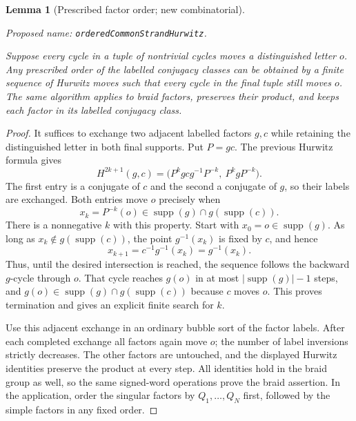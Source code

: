 \documentclass[11pt,a4paper]{article}
\newtheorem{lemma}[theorem]{Lemma}
\theoremstyle{remark}
\newcommand{\formalname}[1]{\leavevmode\par\noindent\textnormal{\small Proposed name: \texttt{#1}.}\par\smallskip}
\begin{document}
\begin{lemma}[Prescribed factor order; new combinatorial]
\label{lem:ordered-hurwitz}
\formalname{orderedCommonStrandHurwitz}
Suppose every cycle in a tuple of nontrivial cycles moves a distinguished
letter $o$.  Any prescribed order of the labelled conjugacy classes can
be obtained by a finite sequence of Hurwitz moves such that every cycle
in the final tuple still moves $o$.  The same algorithm applies to braid
factors, preserves their product, and keeps each factor in its labelled
conjugacy class.
\end{lemma}
\begin{proof}
It suffices to exchange two adjacent labelled factors $g,c$ while
retaining the distinguished letter in both final supports.  Put $P=gc$.
The previous Hurwitz formula gives
\[
 H^{2k+1}(g,c)=
 \bigl(P^k g c g^{-1}P^{-k},\ P^k gP^{-k}\bigr).
\]
The first entry is a conjugate of $c$ and the second a conjugate of
$g$, so their labels are exchanged.  Both entries move $o$ precisely
when
\[
 x_k=P^{-k}(o)\in \operatorname{supp}(g)\cap
                              g(\operatorname{supp}(c)).
\]
There is a nonnegative $k$ with this property.  Start with
$x_0=o\in\operatorname{supp}(g)$.  As long as
$x_k\notin g(\operatorname{supp}(c))$, the point $g^{-1}(x_k)$ is
fixed by $c$, and hence
\[
 x_{k+1}=c^{-1}g^{-1}(x_k)=g^{-1}(x_k).
\]
Thus, until the desired intersection is reached, the sequence follows
the backward $g$-cycle through $o$.  That cycle reaches $g(o)$ in at
most $|\operatorname{supp}(g)|-1$ steps, and
$g(o)\in\operatorname{supp}(g)\cap g(\operatorname{supp}(c))$
because $c$ moves $o$.  This proves termination and gives an explicit
finite search for $k$.

Use this adjacent exchange in an ordinary bubble sort of the factor
labels.  After each completed exchange all factors again move $o$;
the number of label inversions strictly decreases.  The other factors
are untouched, and the displayed Hurwitz identities preserve the
product at every step.  All identities hold in the braid group as
well, so the same signed-word operations prove the braid assertion.
In the application, order the singular factors by $Q_1,\ldots,Q_N$
first, followed by the simple factors in any fixed order.
\end{proof}
\end{document}
